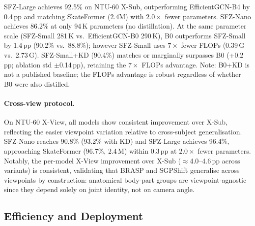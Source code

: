 \documentclass[sigconf,screen,review,anonymous]{acmart}
\begin{document}
SFZ-Large achieves 92.5\% on NTU-60 X-Sub, outperforming Ef\-ficientGCN-B4
by 0.4\,pp and matching SkateFormer (2.4M) with $2.0{\times}$ fewer parameters.
SFZ-Nano achieves 86.2\% at only 94\,K parameters (no distillation).
At the same parameter scale (SFZ-Small 281\,K vs.\ Ef\-ficientGCN-B0 290\,K),
B0 outperforms SFZ-Small by 1.4\,pp (90.2\% vs.\ 88.8\%);
however SFZ-Small uses $7{\times}$ fewer FLOPs (0.39\,G vs.\ 2.73\,G).
SFZ-Small+KD (90.4\%) matches or marginally surpasses B0 (+0.2\,pp;
ablation std $\pm$0.14\,pp), retaining the $7{\times}$ FLOPs advantage.
Note: B0+KD is not a published baseline; the FLOPs advantage is robust
regardless of whether B0 were also distilled.

\paragraph{Cross-view protocol.}
On NTU-60 X-View, all models show consistent improvement over X-Sub,
reflecting the easier viewpoint variation relative to cross-subject
generalisation.
SFZ-Nano reaches 90.8\% (93.2\% with KD) and SFZ-Large achieves 96.4\%,
approaching SkateFormer (96.7\%, 2.4\,M) within 0.3\,pp at $2.0{\times}$ fewer parameters.
Notably, the per-model X-View improvement over X-Sub
(${\approx}$4.0--4.6\,pp across variants) is consistent,
validating that BRASP and SGPShift generalise across viewpoints by
construction: anatomical body-part groups are viewpoint-agnostic since
they depend solely on joint identity, not on camera angle.

\subsection{Efficiency and Deployment}\label{sec:efficiency}
\end{document}
